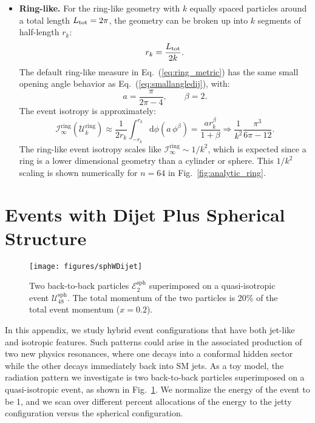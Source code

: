 \documentclass[letterpaper,11pt]{article}
\newcommand{\iso}[2]{\mathcal{I}^\text{#1}_{#2}}
\DeclareRobustCommand{\Fig}[1]{Fig.~\ref{#1}}
\DeclareRobustCommand{\Eq}[1]{Eq.~(\ref{#1})}
\begin{document}
\begin{itemize}
\item \textbf{Ring-like.}  For the ring-like geometry with $k$ equally spaced particles around a total length $L_{\rm tot} = 2\pi$, the geometry can be broken up into $k$ segments of half-length $r_k$:
%
\begin{equation}
r_k = \frac{L_{\rm tot}}{2k}.
\end{equation}
%
The default ring-like measure in \Eq{eq:ring_metric} has the same small opening angle behavior as \Eq{eq:smallangledij}, with:
%
\begin{equation}
a = \frac{\pi}{2\pi -4}, \qquad \beta = 2.
\end{equation} 
%
The event isotropy is approximately:
%
\begin{equation}
\iso{ring}{\infty}( \mathcal{U}^\text{ring}_k ) \approx \frac{1}{2 r_k} \int_{-r_k}^{r_k} \text{d} \phi \left(a \, \phi^\beta \right) = \frac{a r_k^\beta}{1+\beta} \Rightarrow \frac{1}{k^2} \frac{\pi^3}{6 \pi -12}.
\label{eq:ringApprox}
\end{equation}
%
The ring-like event isotropy scales like $\iso{ring}{\infty} \sim 1/k^2$, which is expected since a ring is a lower dimensional geometry than a cylinder or sphere.
%
This $1/k^2$ scaling is shown numerically for $n=64$ in \Fig{fig:analytic_ring}.

\end{itemize}



\section{Events with Dijet Plus Spherical Structure}
\label{app:dijetSphere}

\begin{figure}[t!]
\centering
%
\texttt{[image: figures/sphWDijet]}
%
\caption{Two back-to-back particles $\mathcal{E}^\text{sph}_2$ superimposed on a quasi-isotropic event $\mathcal{U}^\text{sph}_{48}$.
%
The total momentum of the two particles is 20\% of the total event momentum ($x=0.2$).}
%
\label{fig:sphDijetVis}
%
\end{figure}


In this appendix, we study hybrid event configurations that have both jet-like and isotropic features.
%
Such patterns could arise in the associated production of two new physics resonances, where one decays into a conformal hidden sector while the other decays immediately back into SM jets. 
%
As a toy model, the radiation pattern we investigate is two back-to-back particles superimposed on a quasi-isotropic event, as shown in \Fig{fig:sphDijetVis}.
%
We normalize the energy of the event to be 1, and we scan over different percent allocations of the energy to the jetty configuration versus the spherical configuration.
\end{document}
